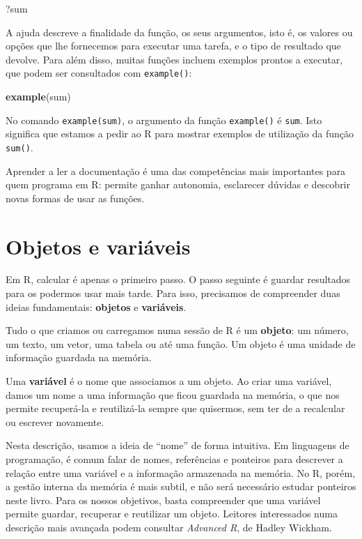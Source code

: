 \documentclass[
  portuguese,
  11pt,
  openany]{book}
\newenvironment{Shaded}{\begin{snugshade}}{\end{snugshade}}
\newcommand{\FunctionTok}[1]{\textcolor[rgb]{0.13,0.29,0.53}{\textbf{#1}}}
\newcommand{\NormalTok}[1]{#1}
\begin{document}
\begin{Shaded}
\begin{Highlighting}[]
\NormalTok{?sum}
\end{Highlighting}
\end{Shaded}

A ajuda descreve a finalidade da função, os seus argumentos, isto é, os valores ou opções que lhe fornecemos para executar uma tarefa, e o tipo de resultado que devolve. Para além disso, muitas funções incluem exemplos prontos a executar, que podem ser consultados com \texttt{example()}:

\begin{Shaded}
\begin{Highlighting}[]
\FunctionTok{example}\NormalTok{(sum)}
\end{Highlighting}
\end{Shaded}

No comando \texttt{example(sum)}, o argumento da função \texttt{example()} é \texttt{sum}. Isto significa que estamos a pedir ao R para mostrar exemplos de utilização da função \texttt{sum()}.

Aprender a ler a documentação é uma das competências mais importantes para quem programa em R: permite ganhar autonomia, esclarecer dúvidas e descobrir novas formas de usar as funções.

\section{Objetos e variáveis}\label{objetos-e-variuxe1veis}

Em R, calcular é apenas o primeiro passo. O passo seguinte é guardar resultados para os podermos usar mais tarde. Para isso, precisamos de compreender duas ideias fundamentais: \textbf{objetos} e \textbf{variáveis}.

Tudo o que criamos ou carregamos numa sessão de R é um \textbf{objeto}: um número, um texto, um vetor, uma tabela ou até uma função. Um objeto é uma unidade de informação guardada na memória.

Uma \textbf{variável} é o nome que associamos a um objeto. Ao criar uma variável, damos um nome a uma informação que ficou guardada na memória, o que nos permite recuperá-la e reutilizá-la sempre que quisermos, sem ter de a recalcular ou escrever novamente.

Nesta descrição, usamos a ideia de ``nome'' de forma intuitiva. Em linguagens de programação, é comum falar de nomes, referências e ponteiros para descrever a relação entre uma variável e a informação armazenada na memória. No R, porém, a gestão interna da memória é mais subtil, e não será necessário estudar ponteiros neste livro. Para os nossos objetivos, basta compreender que uma variável permite guardar, recuperar e reutilizar um objeto. Leitores interessados numa descrição mais avançada podem consultar \emph{Advanced R}, de Hadley Wickham.
\end{document}

